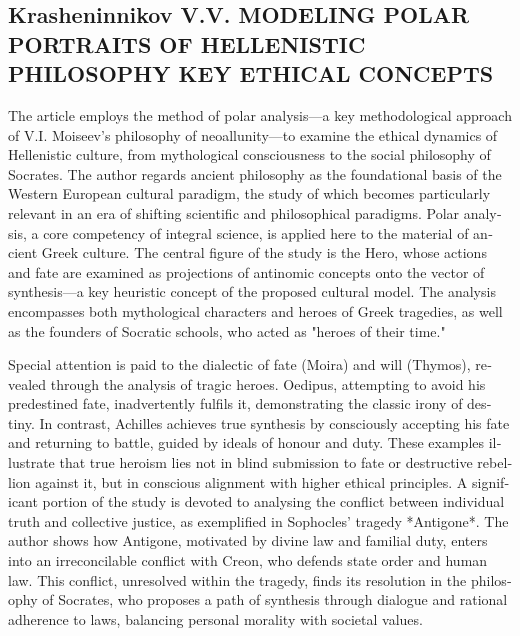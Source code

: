 \ifprintabstract
    \begin{english}
    \subsection{Krasheninnikov V.V. MODELING POLAR PORTRAITS OF HELLENISTIC PHILOSOPHY KEY ETHICAL CONCEPTS}
    \label{subsec:krasheninnikov-en}

    {\itshape }

    The article employs the method of polar analysis—a key methodological approach of V.I. Moiseev's philosophy of neoallunity—to examine the ethical dynamics of Hellenistic culture, from mythological consciousness to the social philosophy of Socrates. The author regards ancient philosophy as the foundational basis of the Western European cultural paradigm, the study of which becomes particularly relevant in an era of shifting scientific and philosophical paradigms. Polar analysis, a core competency of integral science, is applied here to the material of ancient Greek culture. The central figure of the study is the Hero, whose actions and fate are examined as projections of antinomic concepts onto the vector of synthesis—a key heuristic concept of the proposed cultural model. The analysis encompasses both mythological characters and heroes of Greek tragedies, as well as the founders of Socratic schools, who acted as "heroes of their time."

    Special attention is paid to the dialectic of fate (Moira) and will (Thymos), revealed through the analysis of tragic heroes. Oedipus, attempting to avoid his predestined fate, inadvertently fulfils it, demonstrating the classic irony of destiny. In contrast, Achilles achieves true synthesis by consciously accepting his fate and returning to battle, guided by ideals of honour and duty. These examples illustrate that true heroism lies not in blind submission to fate or destructive rebellion against it, but in conscious alignment with higher ethical principles. A significant portion of the study is devoted to analysing the conflict between individual truth and collective justice, as exemplified in Sophocles' tragedy *Antigone*. The author shows how Antigone, motivated by divine law and familial duty, enters into an irreconcilable conflict with Creon, who defends state order and human law. This conflict, unresolved within the tragedy, finds its resolution in the philosophy of Socrates, who proposes a path of synthesis through dialogue and rational adherence to laws, balancing personal morality with societal values.


\end{english}
